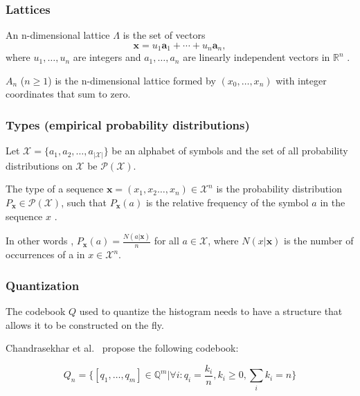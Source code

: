 \subsubsection{Lattices}
\label{sec:lattices}

An n-dimensional lattice $\Lambda$ is the set of vectors
\begin{equation}
    \mathbf{x} = u_1 \mathbf{a}_1 + \cdots + u_n \mathbf{a}_n,
\end{equation}
where $u_1, \ldots, u_n$ are integers and $a_1, \ldots, a_n$ are linearly independent vectors in $\mathbb{R}^n$ \cite{ConwayS82a}.

$A_n$ ($n \geq 1$) is the n-dimensional lattice formed by $(x_0, \ldots, x_n)$ with integer coordinates that sum to zero.

\subsubsection{Types (empirical probability distributions)}
\label{sec:types}

Let $\mathcal{X} = \{a_1,a_2,\ldots,a_{\left|\mathcal{X}\right|}\}$ be an alphabet of symbols and the set of all probability distributions on $\mathcal{X}$ be $\mathcal{P}(\mathcal{X})$.

The type of a sequence $\mathbf{x} = (x_1, x_2 \ldots, x_n) \in \mathcal{X}^n$ is the probability distribution $P_{\mathbf{x}} \in \mathcal{P}(\mathcal{X})$, such that $P_{\mathbf{x}}(a)$ is the relative frequency of the symbol $a$ in the sequence $x$ \cite{methodoftypes}.

In other words \cite{infotheory}, $P_{\mathbf{x}}(a) = \frac{N(a|\mathbf{x})}{n}$ for all $a \in \mathcal{X}$, where $N(x|\mathbf{x})$ is the number of occurrences of a in $x \in \mathcal{X}^n$.

\subsubsection{Quantization}

The codebook $Q$ used to quantize the histogram needs to have a structure that allows it to be constructed on the fly.

Chandrasekhar et al.\ \cite{chog2011} propose the following codebook:

\begin{equation}
    Q_n = \{ [q_1,\ldots,q_m] \in \mathbb{Q}^m | \forall i: q_i = \frac{k_i}{n}, k_i \geq 0, \sum_i k_i = n \}
\end{equation}

